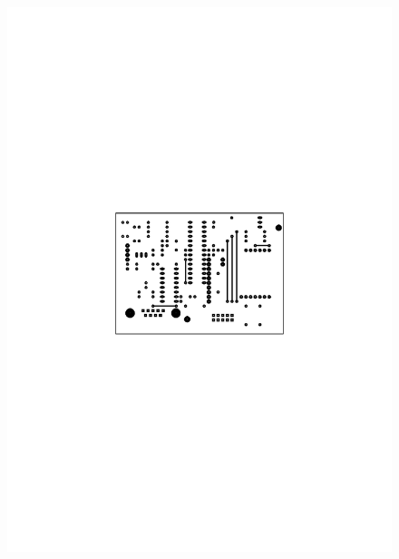 \documentclass[paper=a4, parskip, numbers=noenddot, toc=listof, headsepline]{scrbook}
\begin{document}
		\begin{figure}
			\centering
			\includegraphics[scale=1]{Bilder/Transmittertop}\vspace{5mm}\\

\end{figure}
\end{document}
